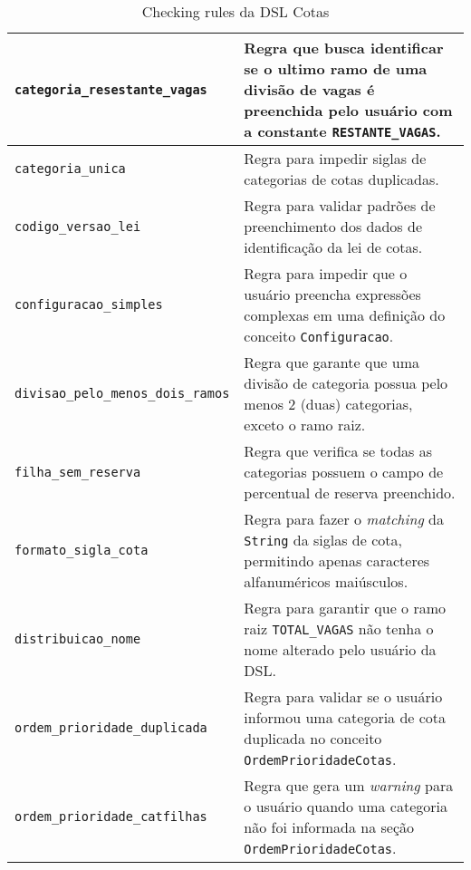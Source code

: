 \begin{table}[ht]
\caption{Checking rules da DSL Cotas}
\label{tblcheckingrules}
\centering

\begin{tabular}{|p{6cm}|p{9cm}|}
\hline
\texttt{categoria\_resestante\_vagas} & Regra que busca identificar se o ultimo ramo de uma divisão de vagas é preenchida pelo usuário com a constante \texttt{RESTANTE\_VAGAS}.                                                                                      \\ \hline
\texttt{categoria\_unica} & Regra para impedir siglas de categorias de cotas duplicadas.                         \\ \hline
\texttt{codigo\_versao\_lei}          & Regra para validar padrões de preenchimento dos dados de identificação da lei de cotas.                                       \\ \hline
\texttt{configuracao\_simples}          & Regra para impedir que o usuário preencha expressões complexas em uma definição do conceito \texttt{Configuracao}.
                        \\ \hline
\texttt{divisao\_pelo\_menos\_dois\_ramos}          & Regra que garante que uma divisão de categoria possua pelo menos 2 (duas) categorias, exceto o ramo raiz.
                        \\ \hline
\texttt{filha\_sem\_reserva}          & Regra que verifica se todas as categorias possuem o campo de percentual de reserva preenchido.

\\ \hline
               
\texttt{formato\_sigla\_cota}          & Regra para fazer o \textit{matching} da \texttt{String} da siglas de cota, permitindo apenas caracteres alfanuméricos maiúsculos.
\\ \hline

\texttt{distribuicao\_nome}          & Regra para garantir que o ramo raiz \texttt{TOTAL\_VAGAS} não tenha o nome alterado pelo usuário da DSL.
\\ \hline

\texttt{ordem\_prioridade\_duplicada}          & Regra para validar se o usuário informou uma categoria de cota duplicada no conceito \texttt{OrdemPrioridadeCotas}.
\\ \hline

\texttt{ordem\_prioridade\_catfilhas}          & Regra que gera um \textit{warning} para o usuário quando uma categoria não foi informada na seção \texttt{OrdemPrioridadeCotas}.
\\ \hline


\end{tabular}
\end{table}
